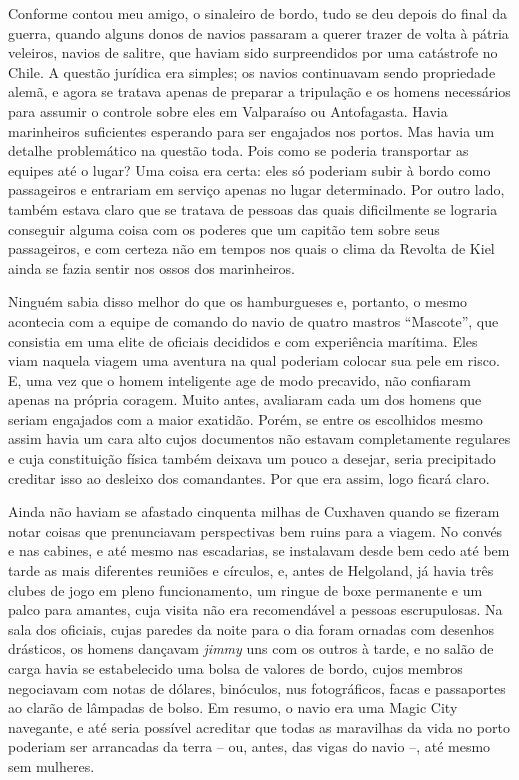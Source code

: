 Conforme contou meu amigo, o sinaleiro de bordo, tudo se deu depois do
final da guerra, quando alguns donos de navios passaram a querer trazer
de volta à pátria veleiros, navios de salitre, que haviam sido
surpreendidos por uma catástrofe no Chile. A questão jurídica era
simples; os navios continuavam sendo propriedade alemã, e agora se
tratava apenas de preparar a tripulação e os homens necessários para
assumir o controle sobre eles em Valparaíso ou Antofagasta. Havia
marinheiros suficientes esperando para ser engajados nos portos. Mas
havia um detalhe problemático na questão toda. Pois como se poderia
transportar as equipes até o lugar? Uma coisa era certa: eles só
poderiam subir à bordo como passageiros e entrariam em serviço apenas no
lugar determinado. Por outro lado, também estava claro que se tratava de
pessoas das quais dificilmente se lograria conseguir alguma coisa com os
poderes que um capitão tem sobre seus passageiros, e com certeza não em
tempos nos quais o clima da Revolta de Kiel ainda se fazia sentir nos
ossos dos marinheiros.

Ninguém sabia disso melhor do que os hamburgueses e, portanto, o mesmo
acontecia com a equipe de comando do navio de quatro mastros
``Mascote'', que consistia em uma elite de oficiais decididos e com
experiência marítima. Eles viam naquela viagem uma aventura na qual
poderiam colocar sua pele em risco. E, uma vez que o homem inteligente
age de modo precavido, não confiaram apenas na própria coragem. Muito
antes, avaliaram cada um dos homens que seriam engajados com a maior
exatidão. Porém, se entre os escolhidos mesmo assim havia um cara alto
cujos documentos não estavam completamente regulares e cuja constituição
física também deixava um pouco a desejar, seria precipitado creditar
isso ao desleixo dos comandantes. Por que era assim, logo ficará claro.

Ainda não haviam se afastado cinquenta milhas de Cuxhaven quando se
fizeram notar coisas que prenunciavam perspectivas bem ruins para a
viagem. No convés e nas cabines, e até mesmo nas escadarias, se
instalavam desde bem cedo até bem tarde as mais diferentes reuniões e
círculos, e, antes de Helgoland, já havia três clubes de jogo em pleno
funcionamento, um ringue de boxe permanente e um palco para amantes,
cuja visita não era recomendável a pessoas escrupulosas. Na sala dos
oficiais, cujas paredes da noite para o dia foram ornadas com desenhos
drásticos, os homens dançavam \emph{jimmy} uns com os outros à tarde, e
no salão de carga havia se estabelecido uma bolsa de valores de bordo,
cujos membros negociavam com notas de dólares, binóculos, nus
fotográficos, facas e passaportes ao clarão de lâmpadas de bolso. Em
resumo, o navio era uma Magic City navegante, e até seria possível
acreditar que todas as maravilhas da vida no porto poderiam ser
arrancadas da terra -- ou, antes, das vigas do navio --, até mesmo sem
mulheres.

